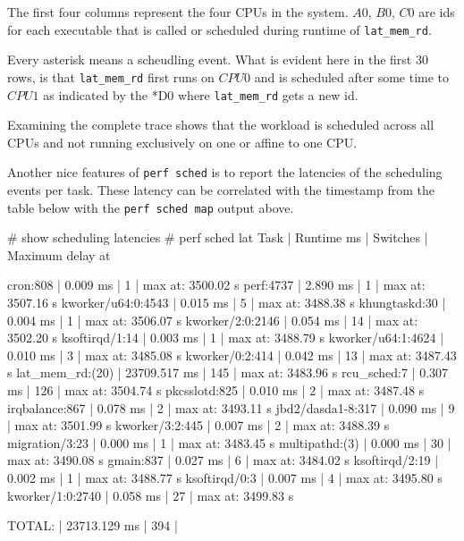 The first four columns represent the four CPUs in the system.  $A0$,
$B0$, $C0$ are ids for each executable that is called or scheduled
during runtime of {\tt lat_mem_rd}.

Every asterisk means a scheudling event. What is evident here in the
first 30 rows, is that {\tt lat_mem_rd} first runs on $CPU0$ and is
scheduled after some time to $CPU1$ as indicated by the *D0 where
{\tt lat_mem_rd} gets a new id.

Examining the complete trace shows that the workload is scheduled
across all CPUs and not running exclusively on one or affine to one
CPU.

Another nice features of {\tt perf sched} is to report the latencies of
the scheduling events per task. These latency can be correlated with
the timestamp from the table below with the {\tt perf sched map} output
above.

\starttyping
# show scheduling latencies
# perf sched lat
 Task                  |   Runtime ms  | Switches | Maximum delay at

 cron:808              |      0.009 ms |        1 | max at: 3500.02 s
 perf:4737             |      2.890 ms |        1 | max at: 3507.16 s
 kworker/u64:0:4543    |      0.015 ms |        5 | max at: 3488.38 s
 khungtaskd:30         |      0.004 ms |        1 | max at: 3506.07 s
 kworker/2:0:2146      |      0.054 ms |       14 | max at: 3502.20 s
 ksoftirqd/1:14        |      0.003 ms |        1 | max at: 3488.79 s
 kworker/u64:1:4624    |      0.010 ms |        3 | max at: 3485.08 s
 kworker/0:2:414       |      0.042 ms |       13 | max at: 3487.43 s
 lat_mem_rd:(20)       |  23709.517 ms |      145 | max at: 3483.96 s
 rcu_sched:7           |      0.307 ms |      126 | max at: 3504.74 s
 pkcsslotd:825         |      0.010 ms |        2 | max at: 3487.48 s
 irqbalance:867        |      0.078 ms |        2 | max at: 3493.11 s
 jbd2/dasda1-8:317     |      0.090 ms |        9 | max at: 3501.99 s
 kworker/3:2:445       |      0.007 ms |        2 | max at: 3488.39 s
 migration/3:23        |      0.000 ms |        1 | max at: 3483.45 s
 multipathd:(3)        |      0.000 ms |       30 | max at: 3490.08 s
 gmain:837             |      0.027 ms |        6 | max at: 3484.02 s
 ksoftirqd/2:19        |      0.002 ms |        1 | max at: 3488.77 s
 ksoftirqd/0:3         |      0.007 ms |        4 | max at: 3495.80 s
 kworker/1:0:2740      |      0.058 ms |       27 | max at: 3499.83 s

 TOTAL:                |  23713.129 ms |      394 |

